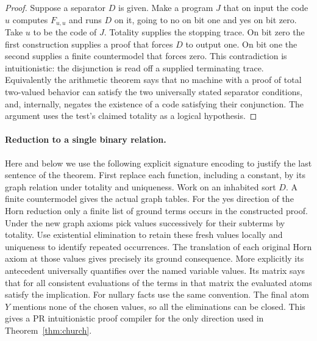 \begin{proof}
Suppose a separator $D$ is given. Make a program $J$ that on input the code $u$ computes $F_{u,u}$ and runs $D$ on it, going to no on bit one and yes on bit zero. Take $u$ to be the code of $J$. Totality supplies the stopping trace. On bit zero the first construction supplies a proof that forces $D$ to output one. On bit one the second supplies a finite countermodel that forces zero. This contradiction is intuitionistic: the disjunction is read off a supplied terminating trace. Equivalently the arithmetic theorem says that no machine with a proof of total two-valued behavior can satisfy the two universally stated separator conditions, and, internally, negates the existence of a code satisfying their conjunction. The argument uses the test's claimed totality as a logical hypothesis.
\end{proof}

\paragraph{Reduction to a single binary relation.}
Here and below we use the following explicit signature encoding to justify the last sentence of the theorem. First replace each function, including a constant, by its graph relation under totality and uniqueness. Work on an inhabited sort $D$. A finite countermodel gives the actual graph tables. For the yes direction of the Horn reduction only a finite list of ground terms occurs in the constructed proof. Under the new graph axioms pick values successively for their subterms by totality. Use existential elimination to retain these fresh values locally and uniqueness to identify repeated occurrences. The translation of each original Horn axiom at those values gives precisely its ground consequence. More explicitly its antecedent universally quantifies over the named variable values. Its matrix says that for all consistent evaluations of the terms in that matrix the evaluated atoms satisfy the implication. For nullary facts use the same convention. The final atom $Y$ mentions none of the chosen values, so all the eliminations can be closed. This gives a PR intuitionistic proof compiler for the only direction used in Theorem~\ref{thm:church}.

